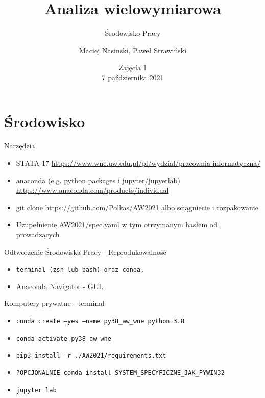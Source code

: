 \documentclass{beamer}
\begin{document}
\begin{frame}
\title[Tytuł]{Analiza wielowymiarowa}
\subtitle{Środowisko Pracy}
\author{Maciej Nasinski, Paweł Strawiński}
\date{Zajęcia 1 \\ 7 października 2021}
\titlepage
\end{frame}

\section{Środowisko}

\begin{frame}{Narzędzia}
  \begin{itemize}
  \item STATA 17 \url{https://www.wne.uw.edu.pl/pl/wydzial/pracownia-informatyczna/}
  \item anaconda (e.g. python packages i jupyter/jupyerlab) \url{https://www.anaconda.com/products/individual}
  \item git clone \url{https://github.com/Polkas/AW2021} albo sciągniecie i rozpakowanie
  \item Uzupełnienie AW2021/spec.yaml w tym otrzymanym hasłem od prowadzących
  \end{itemize}
\end{frame}

\begin{frame}{Odtworzenie Środowiska Pracy - Reprodukowalność}
  \begin{itemize}
  \item \texttt{terminal (zsh lub bash) oraz conda.}
  \item Anaconda Navigator - GUI.
  \end{itemize}
\end{frame}

\begin{frame}{Komputery prywatne - terminal}
  \begin{itemize}
  \item \texttt{conda create --yes --name py38\_aw\_wne python=3.8} 
  \item \texttt{conda activate py38\_aw\_wne}
  \item \texttt{pip3 install -r ./AW2021/requirements.txt}
  \item \texttt{?OPCJONALNIE conda install SYSTEM\_SPECYFICZNE\_JAK\_PYWIN32}
  \item \texttt{jupyter lab}
  \end{itemize}
\end{frame}
\end{document}
